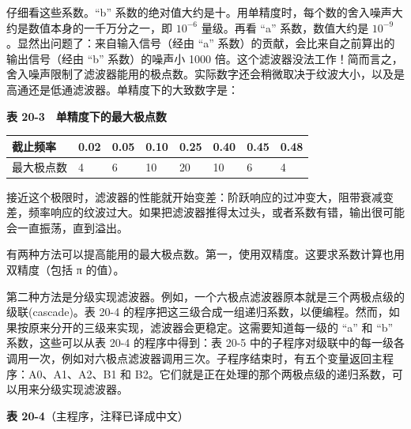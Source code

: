 仔细看这些系数。``b''
系数的绝对值大约是十。用单精度时，每个数的舍入噪声大约是数值本身的一千万分之一，即
\(10^{-6}\) 量级。再看 ``a'' 系数，数值大约是
\(10^{-9}\)。显然出问题了：来自输入信号（经由 ``a''
系数）的贡献，会比来自之前算出的输出信号（经由 ``b'' 系数）的噪声小 1000
倍。这个滤波器没法工作！简而言之，舍入噪声限制了滤波器能用的极点数。实际数字还会稍微取决于纹波大小，以及是高通还是低通滤波器。单精度下的大致数字是：

\textbf{表 20-3　单精度下的最大极点数}

\begingroup\scriptsize\setlength{\tabcolsep}{3pt}

{\def\LTcaptype{none} %
\begin{longtable}[]{@{}llllllll@{}}
\toprule\noalign{}
截止频率 & 0.02 & 0.05 & 0.10 & 0.25 & 0.40 & 0.45 & 0.48 \\
\midrule\noalign{}
\endhead
\bottomrule\noalign{}
\endlastfoot
最大极点数 & 4 & 6 & 10 & 20 & 10 & 6 & 4 \\
\end{longtable}
}

\endgroup

接近这个极限时，滤波器的性能就开始变差：阶跃响应的过冲变大，阻带衰减变差，频率响应的纹波过大。如果把滤波器推得太过头，或者系数有错，输出很可能会一直振荡，直到溢出。

有两种方法可以提高能用的最大极点数。第一，使用双精度。这要求系数计算也用双精度（包括
π 的值）。

第二种方法是分级实现滤波器。例如，一个六极点滤波器原本就是三个两极点级的级联(cascade)。表
20-4
的程序把这三级合成一组递归系数，以便编程。然而，如果按原来分开的三级来实现，滤波器会更稳定。这需要知道每一级的
``a'' 和 ``b'' 系数，这些可以从表 20-4 的程序中得到：表 20-5
中的子程序对级联中的每一级各调用一次，例如对六极点滤波器调用三次。子程序结束时，有五个变量返回主程序：A0、A1、A2、B1
和
B2。它们就是正在处理的那个两极点级的递归系数，可以用来分级实现滤波器。

\textbf{表 20-4}（主程序，注释已译成中文）

